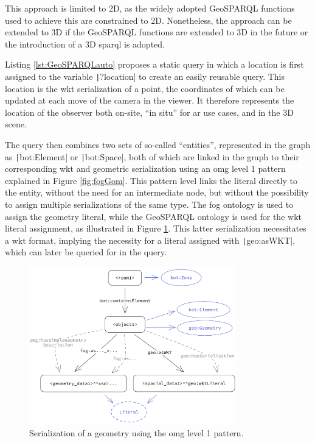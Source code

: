 This approach is limited to 2D, as the widely adopted GeoSPARQL functions used to achieve this are constrained to 2D. Nonetheless, the approach can be extended to 3D if the GeoSPARQL functions are extended to 3D in the future or the introduction of a 3D \ac{sparql} is adopted.

Listing \ref{lst:GeoSPARQLauto} proposes a static query in which a location is first assigned to the variable \texttt|?location| to create an easily reusable query. This location is the \ac{wkt} serialization of a point, the coordinates of which can be updated at each move of the camera in the viewer. It therefore represents the location of the observer both on-site, \enquote{in situ} for \ac{ar} use cases, and in the 3D scene.

The query then combines two sets of so-called \enquote{entities}, represented in the graph as \texttt|bot:Element| or \texttt|bot:Space|, both of which are linked in the graph to their corresponding \ac{wkt} and geometric serialization using an \ac{omg} level 1 pattern explained in Figure \ref{fig:fogGom}. This pattern level links the literal directly to the entity, without the need for an intermediate node, but without the possibility to assign multiple serializations of the same type. The \ac{fog} ontology is used to assign the geometry literal, while the GeoSPARQL ontology is used for the \ac{wkt} literal assignment, as illustrated in Figure \ref{fig:omg1}. This latter serialization necessitates a \ac{wkt} format, implying the necessity for a literal assigned with \texttt|geo:asWKT|, which can later be queried for in the query.

\begin{figure}[H]
    \centering
    \includegraphics[width=0.8\textwidth]{figures/pdf/omg1.pdf}
    \caption[Serialization, \acs{omg} level 1]{Serialization of a geometry using the \acs{omg} level 1 pattern.}
    \label{fig:omg1}
\end{figure}


